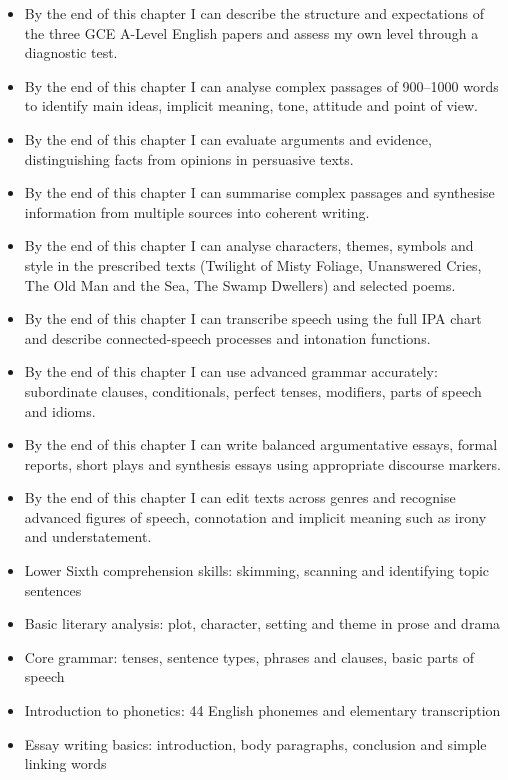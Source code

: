 \documentclass[11pt]{article}
\begin{document}
\begin{objectifs}
\begin{itemize}
\item By the end of this chapter I can describe the structure and expectations of the three GCE A-Level English papers and assess my own level through a diagnostic test.
\item By the end of this chapter I can analyse complex passages of 900–1000 words to identify main ideas, implicit meaning, tone, attitude and point of view.
\item By the end of this chapter I can evaluate arguments and evidence, distinguishing facts from opinions in persuasive texts.
\item By the end of this chapter I can summarise complex passages and synthesise information from multiple sources into coherent writing.
\item By the end of this chapter I can analyse characters, themes, symbols and style in the prescribed texts (Twilight of Misty Foliage, Unanswered Cries, The Old Man and the Sea, The Swamp Dwellers) and selected poems.
\item By the end of this chapter I can transcribe speech using the full IPA chart and describe connected-speech processes and intonation functions.
\item By the end of this chapter I can use advanced grammar accurately: subordinate clauses, conditionals, perfect tenses, modifiers, parts of speech and idioms.
\item By the end of this chapter I can write balanced argumentative essays, formal reports, short plays and synthesis essays using appropriate discourse markers.
\item By the end of this chapter I can edit texts across genres and recognise advanced figures of speech, connotation and implicit meaning such as irony and understatement.
\end{itemize}
\end{objectifs}

\begin{prerequis}
\begin{itemize}
\item Lower Sixth comprehension skills: skimming, scanning and identifying topic sentences
\item Basic literary analysis: plot, character, setting and theme in prose and drama
\item Core grammar: tenses, sentence types, phrases and clauses, basic parts of speech
\item Introduction to phonetics: 44 English phonemes and elementary transcription
\item Essay writing basics: introduction, body paragraphs, conclusion and simple linking words
\end{itemize}
\end{prerequis}
\end{document}
